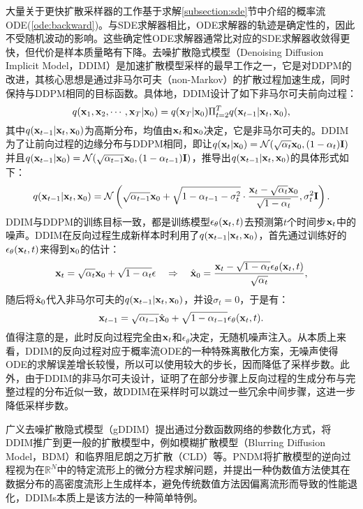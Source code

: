 \documentclass[11pt,a4paper,UTF8]{ctexart}
\begin{document}
大量关于更快扩散采样器的工作基于求解\ref{subsection:sde}节中介绍的概率流ODE(\ref{ode:backward})。与SDE求解器相比，ODE求解器的轨迹是确定性的，因此不受随机波动的影响。这些确定性ODE求解器通常比对应的SDE求解器收敛得更快，但代价是样本质量略有下降。去噪扩散隐式模型（Denoising Diffusion Implicit Model，DDIM）\cite{song2020denoising}是加速扩散模型采样的最早工作之一，它是对DDPM的改进，其核心思想是通过非马尔可夫（non-Markov）的扩散过程加速生成，同时保持与DDPM相同的目标函数。具体地，DDIM设计了如下非马尔可夫前向过程：
\begin{equation*}
    q(\mathbf{x}_1,\mathbf{x}_2,\cdots,\mathbf{x}_T|\mathbf{x}_0)=q(\mathbf{x}_T|\mathbf{x}_0)\Pi_{t=2}^T q(\mathbf{x}_{t-1}|\mathbf{x}_t,\mathbf{x}_0),
\end{equation*}
其中$q(\mathbf{x}_{t-1}|\mathbf{x}_t,\mathbf{x}_0)$为高斯分布，均值由$\mathbf{x}_t$和$\mathbf{x}_0$决定，它是非马尔可夫的。DDIM为了让前向过程的边缘分布与DDPM相同，即让$q(\mathbf{x}_t|\mathbf{x}_0)=\mathcal{N}(\sqrt{\alpha_t}\mathbf{x}_0,(1-\alpha_t)\mathbf{I})$并且$q(\mathbf{x}_{t-1}|\mathbf{x}_0)=\mathcal{N}(\sqrt{\alpha_{t-1}}\mathbf{x}_0,(1-\alpha_{t-1})\mathbf{I})$，推导出$q(\mathbf{x}_{t-1}|\mathbf{x}_t,\mathbf{x}_0)$的具体形式如下：
\begin{equation*}
    q(\mathbf{x}_{t-1}|\mathbf{x}_t,\mathbf{x}_0) = \mathcal{N}\left(\sqrt{\alpha_{t-1}}\mathbf{x}_0 + \sqrt{1-\alpha_{t-1}-\sigma_t^2}\cdot\frac{\mathbf{x}_t-\sqrt{\alpha_t}\mathbf{x}_0}{\sqrt{1-\alpha_t}},\sigma_t^2\mathbf{I} \right).
\end{equation*}
DDIM与DDPM的训练目标一致，都是训练模型$\epsilon_\theta(\mathbf{x}_t,t)$去预测第$t$个时间步$\mathbf{x}_t$中的噪声。DDIM在反向过程生成新样本时利用了$q(\mathbf{x}_{t-1}|\mathbf{x}_t,\mathbf{x}_0)$，首先通过训练好的$\epsilon_\theta(\mathbf{x}_t,t)$来得到$\mathbf{x}_0$的估计：
\begin{equation*}
    \mathbf{x}_t = \sqrt{\alpha_t}\mathbf{x}_0 + \sqrt{1-\alpha_t}\epsilon\quad \Rightarrow\quad \hat{\mathbf{x}}_0 = \frac{\mathbf{x}_t - \sqrt{1-\alpha_t}\epsilon_\theta(\mathbf{x}_t,t)}{\sqrt{\alpha_t}},
\end{equation*}
随后将$\hat{\mathbf{x}}_0$代入非马尔可夫的$q(\mathbf{x}_{t-1}|\mathbf{x}_t,\mathbf{x}_0)$，并设$\sigma_t=0$，于是有：
\begin{equation*}
    \mathbf{x}_{t-1}=\sqrt{\alpha_{t-1}} \hat{\mathbf{x}}_0 + \sqrt{1-\alpha_{t-1}}\epsilon_\theta(\mathbf{x}_t,t).
\end{equation*}
值得注意的是，此时反向过程完全由$\mathbf{x}_t$和$\epsilon_\theta$决定，无随机噪声注入。从本质上来看，DDIM的反向过程对应于概率流ODE的一种特殊离散化方案，无噪声使得ODE的求解误差增长较慢，所以可以使用较大的步长，因而降低了采样步数。此外，由于DDIM的非马尔可夫设计，\cite{song2020denoising}证明了在部分步骤上反向过程的生成分布与完整过程的分布近似一致，故DDIM在采样时可以跳过一些冗余中间步骤，这进一步降低采样步数。

广义去噪扩散隐式模型（gDDIM）\cite{zhang2022gddim}提出通过分数函数网络的参数化方式，将DDIM推广到更一般的扩散模型中，例如模糊扩散模型（Blurring Diffusion Model，BDM）\cite{Hoogeboom2023blurring}和临界阻尼朗之万扩散（CLD）\cite{dockhorn2021score}等。PNDM\cite{liu2021pseudo}将扩散模型的逆向过程视为在$\mathbb{R}^N$中的特定流形上的微分方程求解问题，并提出一种伪数值方法使其在数据分布的高密度流形上生成样本，避免传统数值方法因偏离流形而导致的性能退化，DDIMs本质上是该方法的一种简单特例。
\end{document}

